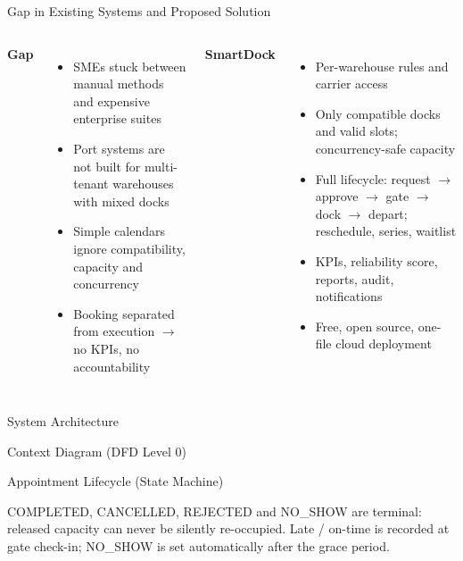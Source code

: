 \documentclass[aspectratio=169,11pt]{beamer}
\newcommand{\diagram}[2][0.78]{\begin{center}\resizebox{!}{#1\textheight}{}\end{center}}
\begin{document}
\begin{frame}{Gap in Existing Systems and Proposed Solution}
\begin{columns}[T]
\textbf{Gap}
\begin{itemize}\small
  \item SMEs stuck between manual methods and expensive enterprise suites
  \item Port systems are not built for multi-tenant warehouses with mixed docks
  \item Simple calendars ignore compatibility, capacity and concurrency
  \item Booking separated from execution $\rightarrow$ no KPIs, no accountability
\end{itemize}
\textbf{SmartDock}
\begin{itemize}\small
  \item Per-warehouse rules and carrier access
  \item Only compatible docks and valid slots; \alert{concurrency-safe} capacity
  \item Full lifecycle: request $\rightarrow$ approve $\rightarrow$ gate $\rightarrow$ dock $\rightarrow$ depart; reschedule, series, waitlist
  \item KPIs, reliability score, reports, audit, notifications
  \item Free, open source, one-file cloud deployment
\end{itemize}
\end{columns}
\end{frame}

\begin{frame}{System Architecture}
\diagram[0.86]{arch}
\end{frame}

\begin{frame}{Context Diagram (DFD Level 0)}
\diagram[0.8]{dfd0}
\end{frame}

\begin{frame}{Appointment Lifecycle (State Machine)}
\begin{center}\resizebox{\textwidth}{!}{}\end{center}
\small COMPLETED, CANCELLED, REJECTED and NO\_SHOW are terminal: released capacity can never be silently re-occupied. Late / on-time is recorded at gate check-in; NO\_SHOW is set automatically after the grace period.
\end{frame}
\end{document}
